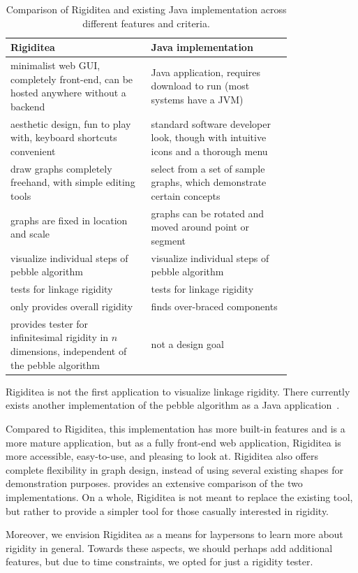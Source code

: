 \documentclass[aps,prd,final,twocolumn,letterpaper,nofootinbib]{revtex4-1}
\begin{document}
\begin{table}[ht]
\def\arraystretch{1.5}
\caption{Comparison of Rigiditea and existing Java implementation
across different features and criteria.}
\begin{tabular}{p{0.4\linewidth} | p{0.4\linewidth}}
Rigiditea & Java implementation \\ \hline
minimalist web GUI, completely front-end, can be hosted anywhere
without a backend &
Java application, requires download to run (most systems have a JVM) \\
aesthetic design, fun to play with, keyboard shortcuts convenient &
standard software developer look, though with intuitive icons
and a thorough menu\\
draw graphs completely freehand,
with simple editing tools &
select from a set of sample graphs,
which demonstrate certain concepts \\
graphs are fixed in location and scale &
graphs can be rotated and moved around point or segment \\
visualize individual steps of pebble algorithm &
visualize individual steps of pebble algorithm\\
tests for linkage rigidity & tests for linkage rigidity\\
only provides overall rigidity & finds over-braced components \\
provides tester for infinitesimal rigidity in $n$ dimensions,
independent of the pebble algorithm
& not a design goal
\end{tabular}
\label{tab:comp}
\end{table}


Rigiditea is not the first application to visualize linkage rigidity.
There currently exists another
implementation of the pebble algorithm as a Java application~\cite{stjohnapplet}.

Compared to Rigiditea, this implementation
has more built-in features and is a more mature application,
but as a fully front-end web application,
Rigiditea is more accessible, easy-to-use, and pleasing to look at.
Rigiditea also offers complete flexibility in graph design,
instead of using several existing shapes for demonstration purposes.
 provides an extensive comparison of the two implementations.
On a whole, Rigiditea is not meant to replace the existing tool,
but rather to provide a simpler tool for those casually interested
in rigidity.

Moreover, we envision Rigiditea as a means for laypersons
to learn more about rigidity in general.
Towards these aspects, we should perhaps add additional features,
but due to time constraints, we opted for just a rigidity tester.
\end{document}
